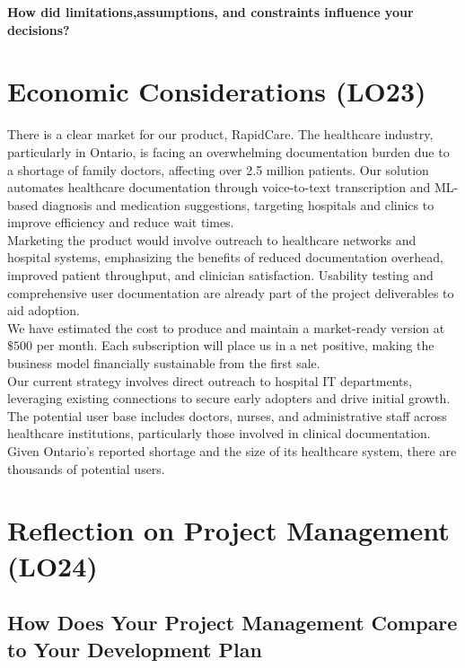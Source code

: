 \documentclass{article}
\begin{document}
\textbf{How did limitations,assumptions, and constraints influence your decisions?}


 \section{Economic Considerations (LO23)}

 There is a clear market for our product, RapidCare. The healthcare industry, particularly in Ontario, is facing an overwhelming documentation burden due to a shortage of family doctors, affecting over 2.5 million patients. Our solution automates healthcare documentation through voice-to-text transcription and ML-based diagnosis and medication suggestions, targeting hospitals and clinics to improve efficiency and reduce wait times. \\
 
 
 \noindent
 Marketing the product would involve outreach to healthcare networks and hospital systems, emphasizing the benefits of reduced documentation overhead, improved patient throughput, and clinician satisfaction. Usability testing and comprehensive user documentation are already part of the project deliverables to aid adoption. \\
 
 
 \noindent
 We have estimated the cost to produce and maintain a market-ready version at $\$500$ per month. Each subscription will place us in a net positive, making the business model financially sustainable from the first sale. \\
 
 \noindent
 Our current strategy involves direct outreach to hospital IT departments, leveraging existing connections to secure early adopters and drive initial growth. The potential user base includes doctors, nurses, and administrative staff across healthcare institutions, particularly those involved in clinical documentation. Given Ontario’s reported shortage and the size of its healthcare system, there are thousands of potential users.
 
 \section{Reflection on Project Management (LO24)}
 
 \subsection{How Does Your Project Management Compare to Your Development Plan}
 
\end{document}
